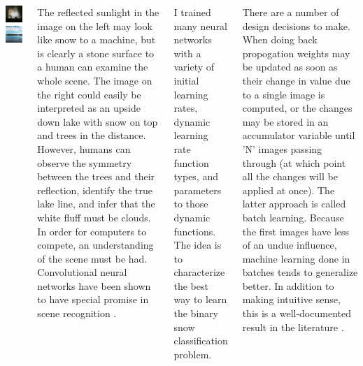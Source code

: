 \documentclass[25pt, a0paper, portrait, margin=0mm, innermargin=15mm,
     blockverticalspace=15mm, colspace=12mm, orientation=landscape]{tikzposter} %
\begin{document}
\begin{columns}
{    \smallskip

        \includegraphics[width=0.5\linewidth]{images/deceptive_1.jpg}
        \includegraphics[width=0.5\linewidth]{images/deceptive_2.jpg}

        \hspace{2em}The reflected sunlight in the image on the left may look like snow to a machine, but is clearly a stone surface to a human can examine the whole scene. The image on the right could easily be interpreted as an upside down lake with snow on top and trees in the distance. However, humans can observe the symmetry between the trees and their reflection, identify the true lake line, and infer that the white fluff must be clouds. In order for computers to compete, an understanding of the scene must be had. Convolutional neural networks have been shown to have special promise in scene recognition \cite{scene}.
     }
         {
        \hspace{2em}I trained many neural networks with a variety of initial learning rates, dynamic learning rate function types, and parameters to those dynamic functions. The idea is to characterize the best way to learn the binary snow classification problem.

        \hspace{2em}There are a number of design decisions to make. When doing back propogation weights may be updated as soon as their change in value due to a single image is computed, or the changes may be stored in an accumulator variable until 'N' images passing through (at which point all the changes will be applied at once). The latter approach is called batch learning. Because the first images have less of an undue influence, machine learning done in batches tends to generalize better. In addition to making intuitive sense, this is a well-documented result in the literature \cite{batch}.

}
\end{columns}
\end{document}
